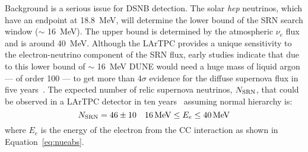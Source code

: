 Background is a serious issue for DSNB detection.
The solar {\em hep} neutrinos, which have an                
endpoint at \SI{18.8}{\MeV}, will determine the lower bound of the SRN
search window ($\sim$ \SI{16}{\MeV}).  The upper bound is determined
by the atmospheric ${\nu}_{e}$ flux and
is around \SI{40}{MeV}.
Although the LArTPC provides a unique sensitivity to the
electron-neutrino component of the SRN flux, early studies indicate
that due to this lower bound of $\sim$ \SI{16}{\MeV} DUNE would need a huge
mass of liquid argon --- of order \SI{100}{\kt} --- to get more than 4$\sigma$
evidence for the diffuse supernova flux in five
years~\cite{Cocco:2004ac}.
%
The expected number of relic
supernova neutrinos, $N_{\rm SRN}$, that could be observed in a
 LArTPC detector in ten years~\cite{Cocco:2004ac}
assuming normal hierarchy is:
\begin{equation}
N_{\rm SRN} = 46 \pm 10  \ \ \ 16 \, {\rm MeV} \leq E_e \leq 40 \, {\rm MeV}
\label{eqn:srnrate}
\end{equation}
where $E_e$ is the energy of the electron from the CC interaction as
shown in Equation~\ref{eq:nueabs}. 


